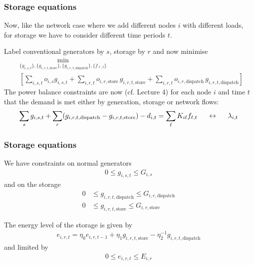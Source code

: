 \documentclass[10pt,aspectratio=169,dvipsnames]{beamer}
\def\l{\lambda}
\begin{document}
\begin{frame}[fragile]
  \frametitle{Storage equations}

  Now, like the network case where we add different nodes $i$
  with different loads, for storage we have to
  consider different time periods $t$.

  Label conventional generators by $s$, storage by $r$ and now minimise
  \begin{align*}
    &    \min_{\{g_{i,s,t}\},\{g_{i,r,t,\textrm{store}}\},\{g_{i,r,t,\textrm{dispatch}}\},\{f_{\ell,t}\}}\\
    &\left[  \sum_{i,s,t} o_{i,s} g_{i,s,t} +   \sum_{i,r,t} o_{i,r,\textrm{store} }\, g_{i,r,t,\textrm{store}} +   \sum_{i,r,t} o_{i,r,\textrm{dispatch}}\, g_{i,r,t,\textrm{dispatch}} \right]
  \end{align*}
  The power balance constraints are now (cf. Lecture 4) for each node $i$ and time $t$ that the demand is met either by generation, storage or network flows:
  \begin{align*}
    \sum_{s} g_{i,s,t} + \sum_{r}(g_{i,r,t,\textrm{dispatch}} - g_{i,r,t,\textrm{store}}) - d_{i,t} = \sum_\ell K_{i\ell}f_{\ell,t}  \hspace{0.5cm}\leftrightarrow\hspace{0.5cm} \l_{i,t}
  \end{align*}
\end{frame}

\begin{frame}[fragile]
  \frametitle{Storage equations}

  We have constraints on normal generators
    \begin{align*}
        0 \leq g_{i,s,t}  \leq  G_{i,s}
  \end{align*}
    and on the storage
    \begin{align*}
    0 & \leq g_{i,r,t,\textrm{dispatch}} \leq G_{i,r,\textrm{dispatch}} \\
    0 & \leq g_{i,r,t,\textrm{store}} \leq G_{i,r,\textrm{store}}
    \end{align*}

    The energy level of the storage is given by
  \begin{align*}
    e_{i,r,t} = \eta_0e_{i,r,t-1} + \eta_1g_{i,r,t,\textrm{store}} -  \eta_2^{-1} g_{i,r,t,\textrm{dispatch}}
  \end{align*}
  and limited by
  \begin{align*}
    0 \leq e_{i,r,t} \leq E_{i,r}
  \end{align*}

\end{frame}
\end{document}
